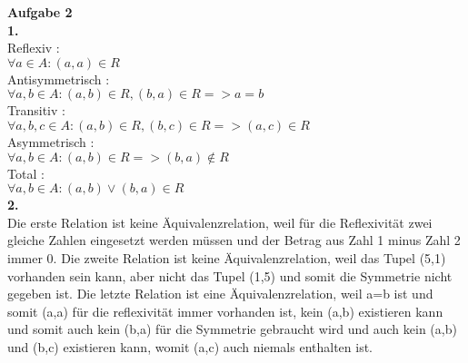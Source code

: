 \documentclass[a4paper, 12pt, ngerman]{article}
\begin{document}
\noindent\textbf {Aufgabe 2}\\
\textbf{1.} \\
Reflexiv : \\
$\forall a \in A : (a,a)\in R$\\
Antisymmetrisch : \\
$\forall a,b \in A : (a,b) \in R, (b,a)\in R => a=b$\\
Transitiv : \\
$\forall a,b,c \in A : (a,b)\in R, (b,c)\in R => (a,c)\in R$\\
Asymmetrisch :\\
$\forall a,b \in A : (a,b)\in R => (b,a)\notin R$\\
Total :\\
$\forall a,b \in A : (a,b) \vee (b,a)\in R$\\
\textbf{2.} \\
Die erste Relation ist keine Äquivalenzrelation, weil für die Reflexivität zwei gleiche Zahlen
eingesetzt werden müssen und der Betrag aus Zahl 1 minus Zahl 2 immer 0.
Die zweite Relation ist keine Äquivalenzrelation, weil das Tupel (5,1) vorhanden sein kann,
aber nicht das Tupel (1,5) und somit die Symmetrie nicht gegeben ist.
Die letzte Relation ist eine Äquivalenzrelation, weil a=b ist und somit (a,a) für die reflexivität
immer vorhanden ist, kein (a,b) existieren kann und somit auch kein (b,a) für die Symmetrie
gebraucht wird und auch kein (a,b) und (b,c) existieren kann, womit (a,c) auch niemals
enthalten ist.
\end{document}
